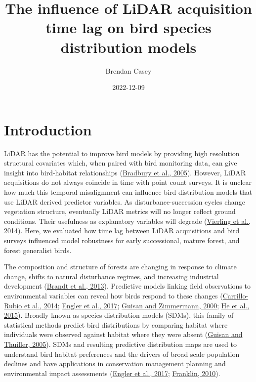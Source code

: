 \documentclass[
]{article}
\title{The influence of LiDAR acquisition time lag on bird species distribution models}
\author{Brendan Casey}
\date{2022-12-09}
\begin{document}
\maketitle

{
\hypersetup{linkcolor=}
\setcounter{tocdepth}{2}
\tableofcontents
}
\hypertarget{introduction}{%
\section{Introduction}\label{introduction}}

LiDAR has the potential to improve bird models by providing high resolution structural covariates which, when paired with bird monitoring data, can give insight into bird-habitat relationships (\protect\hyperlink{ref-Bradbury2005}{Bradbury et al., 2005}). However, LiDAR acquisitions do not always coincide in time with point count surveys. It is unclear how much this temporal misalignment can influence bird distribution models that use LiDAR derived predictor variables. As disturbance-succession cycles change vegetation structure, eventually LiDAR metrics will no longer reflect ground conditions. Their usefulness as explanatory variables will degrade (\protect\hyperlink{ref-VierlingSwift2014}{Vierling et al., 2014}). Here, we evaluated how time lag between LiDAR acquisitions and bird surveys influenced model robustness for early successional, mature forest, and forest generalist birds.

The composition and structure of forests are changing in response to climate change, shifts to natural disturbance regimes, and increasing industrial development (\protect\hyperlink{ref-Brandt2013}{Brandt et al., 2013}). Predictive models linking field observations to environmental variables can reveal how birds respond to these changes (\protect\hyperlink{ref-Carrillo-Rubio2014}{Carrillo-Rubio et al., 2014}; \protect\hyperlink{ref-englerAvianSDMsCurrent2017}{Engler et al., 2017}; \protect\hyperlink{ref-guisanPredictiveHabitatDistribution2000}{Guisan and Zimmermann, 2000}; \protect\hyperlink{ref-He2015}{He et al., 2015}). Broadly known as species distribution models (SDMs), this family of statistical methods predict bird distributions by comparing habitat where individuals were observed against habitat where they were absent (\protect\hyperlink{ref-Guisan2005}{Guisan and Thuiller, 2005}). SDMs and resulting predictive distribution maps are used to understand bird habitat preferences and the drivers of broad scale population declines and have applications in conservation management planning and environmental impact assessments (\protect\hyperlink{ref-englerAvianSDMsCurrent2017}{Engler et al., 2017}; \protect\hyperlink{ref-franklinMappingSpeciesDistributions2010}{Franklin, 2010}).
\end{document}
